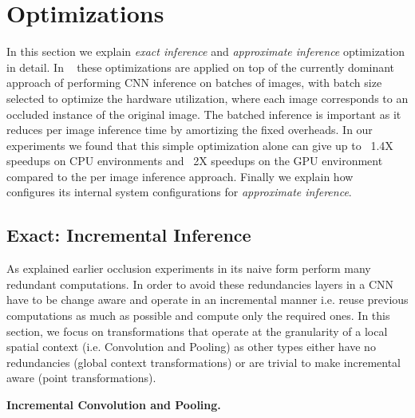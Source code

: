 \section{Optimizations}\label{sec:optimizer}

In this section we explain \textit{exact inference} and \textit{approximate inference} optimization in detail.
In \system~ these optimizations are applied on top of the currently dominant approach of performing CNN inference on batches of images, with batch size selected to optimize the hardware utilization, where each image corresponds to an occluded instance of the original image.
The batched inference is important as it reduces per image inference time by amortizing the fixed overheads.
In our experiments we found that this simple optimization alone can give up to ~1.4X speedups on CPU environments and ~2X speedups on the GPU environment compared to the per image inference approach.
Finally we explain how \system~ configures its internal system configurations for \textit{approximate inference}.

\subsection{Exact: Incremental Inference}\label{sec:inc_computation}

As explained earlier occlusion experiments in its naive form perform many redundant computations.
In order to avoid these redundancies layers in a CNN have to be change aware and operate in an incremental manner i.e. reuse previous computations as much as possible and compute only the required ones.
In this section, we focus on transformations that operate at the granularity of a local spatial context (i.e. Convolution and Pooling) as other types either have no redundancies (global context transformations) or are trivial to make incremental aware (point transformations).

\vspace{2mm}
\noindent \textbf{Incremental Convolution and Pooling.}


